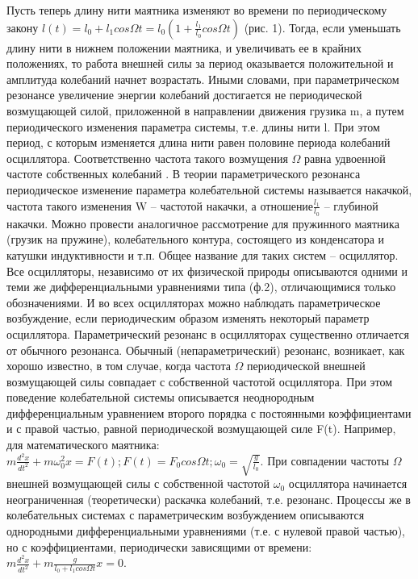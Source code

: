 \documentclass[a4paper,12pt]{article}
\begin{document}
Пусть теперь длину нити маятника  изменяют во времени по периодическому закону $l(t)= l_0+ l_1cos\Omega t = l_0\left(1+\frac{l_1}{l_0}cos{\Omega}t\right)$ (рис. 1).   Тогда, если уменьшать длину нити в нижнем положении маятника, и увеличивать ее в крайних положениях,  то работа внешней силы за период оказывается положительной и амплитуда колебаний начнет возрастать. Иными словами, при параметрическом резонансе увеличение энергии колебаний  достигается  не периодической возмущающей силой, приложенной в направлении движения грузика m, а путем периодического изменения параметра системы, т.е. длины нити l. При этом период, с которым изменяется длина нити равен половине периода колебаний осциллятора. Соответственно частота такого возмущения $\Omega$ равна удвоенной частоте собственных колебаний . В теории параметрического резонанса периодическое изменение параметра колебательной системы называется накачкой, частота такого изменения W – частотой накачки, а отношение$\frac{l_1}{l_0}$ – глубиной накачки. Можно провести аналогичное рассмотрение для пружинного маятника (грузик на пружине), колебательного контура, состоящего из конденсатора и катушки индуктивности и т.п. Общее название для таких систем – осциллятор.  Все осцилляторы, независимо от их физической природы описываются одними и теми же дифференциальными уравнениями типа  (ф.2), отличающимися только обозначениями.  И во всех осцилляторах  можно наблюдать параметрическое возбуждение, если периодическим образом изменять  некоторый параметр осциллятора.
Параметрический резонанс в осцилляторах существенно отличается от обычного резонанса. Обычный (непараметрический) резонанс, возникает,  как хорошо  известно, в том случае, когда частота $\Omega$ периодической внешней возмущающей силы совпадает с собственной частотой   осциллятора. При этом поведение колебательной системы описывается неоднородным дифференциальным уравнением второго порядка с постоянными коэффициентами и с  правой частью,  равной периодической возмущающей силе F(t). Например, для математического маятника: $m\frac{d^2x}{dt^2}+m\omega_0^2x=F(t);F(t)=F_0cos{\Omega}t;\omega_0=\sqrt{\frac{g}{l_0}}$.  
При совпадении частоты $\Omega$ внешней возмущающей силы с собственной частотой $\omega_0$ осциллятора начинается неограниченная (теоретически) раскачка колебаний, т.е. резонанс.   
                 Процессы же в колебательных системах с параметрическим возбуждением описываются  однородными дифференциальными уравнениями (т.е. с нулевой правой частью), но с коэффициентами, периодически зависящими от времени: $m\frac{d^2x}{dt^2}+m\frac{g}{l_0+l_1cos{\Omega}t}x=0$.
\end{document}
